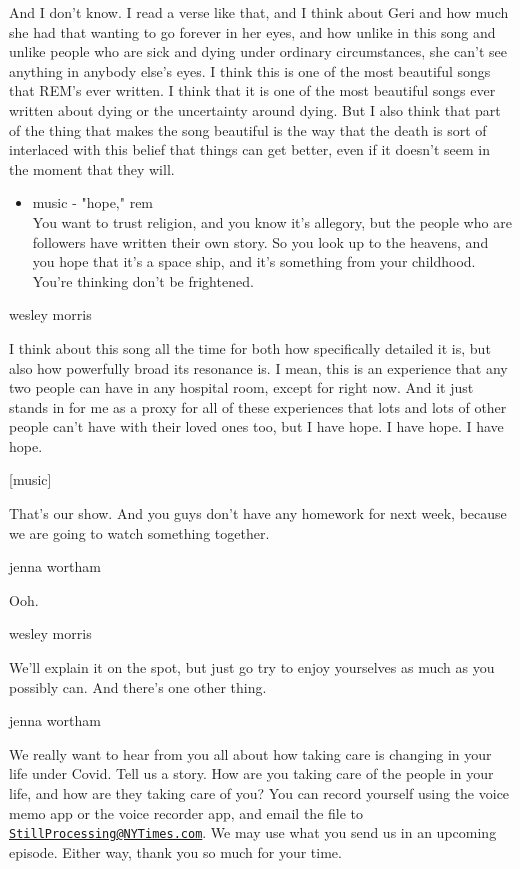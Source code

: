 And I don't know. I read a verse like that, and I think about Geri and
how much she had that wanting to go forever in her eyes, and how unlike
in this song and unlike people who are sick and dying under ordinary
circumstances, she can't see anything in anybody else's eyes. I think
this is one of the most beautiful songs that REM's ever written. I think
that it is one of the most beautiful songs ever written about dying or
the uncertainty around dying. But I also think that part of the thing
that makes the song beautiful is the way that the death is sort of
interlaced with this belief that things can get better, even if it
doesn't seem in the moment that they will.

\begin{itemize}
\tightlist
\item
  music - "hope," rem\\
  You want to trust religion, and you know it's allegory, but the people
  who are followers have written their own story. So you look up to the
  heavens, and you hope that it's a space ship, and it's something from
  your childhood. You're thinking don't be frightened.
\end{itemize}

wesley morris

I think about this song all the time for both how specifically detailed
it is, but also how powerfully broad its resonance is. I mean, this is
an experience that any two people can have in any hospital room, except
for right now. And it just stands in for me as a proxy for all of these
experiences that lots and lots of other people can't have with their
loved ones too, but I have hope. I have hope. I have hope.

{[}music{]}

That's our show. And you guys don't have any homework for next week,
because we are going to watch something together.

jenna wortham

Ooh.

wesley morris

We'll explain it on the spot, but just go try to enjoy yourselves as
much as you possibly can. And there's one other thing.

jenna wortham

We really want to hear from you all about how taking care is changing in
your life under Covid. Tell us a story. How are you taking care of the
people in your life, and how are they taking care of you? You can record
yourself using the voice memo app or the voice recorder app, and email
the file to
\href{mailto:StillProcessing@NYTimes.com}{\nolinkurl{StillProcessing@NYTimes.com}}.
We may use what you send us in an upcoming episode. Either way, thank
you so much for your time.

